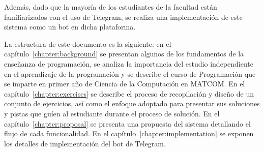 Además, dado que la mayoría de los estudiantes de la facultad están familiarizados con el uso de Telegram, se realiza una implementación de este sistema como un bot en dicha plataforma.

La estructura de este documento es la siguiente: en el capítulo~\ref{chapter:background} se presentan algunos de los fundamentos de la enseñanza de programación, se analiza la importancia del estudio independiente en el aprendizaje de la programación y se describe el curso de Programación que se imparte en primer año de Ciencia de la Computación en \mbox{MATCOM}. En el capítulo~\ref{chapter:exercises} se describe el proceso de recopilación y diseño de un conjunto de ejercicios, así como el enfoque adoptado para presentar sus soluciones y pistas que guíen al estudiante durante el proceso de solución. En el capítulo~\ref{chapter:proposal} se presenta una propuesta del sistema detallando el flujo de cada funcionalidad. En el capítulo~\ref{chapter:implementation} se exponen los detalles de implementación del bot de Telegram.